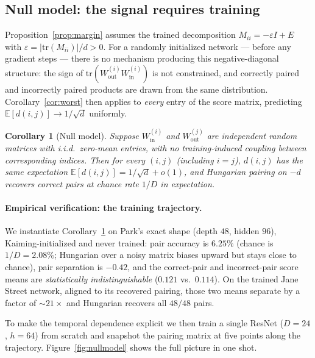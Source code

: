 \documentclass[10pt]{article}
\newtheorem{corollary}{Corollary}
\theoremstyle{remark}
\begin{document}
\subsection{Null model: the signal requires training}\label{sec:nullmodel}

Proposition~\ref{prop:margin} assumes the trained decomposition
$M_{ii} = -\varepsilon I + E$ with $\varepsilon = |\mathrm{tr}(M_{ii})|/d > 0$.
For a randomly initialized network --- before any gradient steps ---
there is no mechanism producing this negative-diagonal structure: the
sign of $\mathrm{tr}(W_{\mathrm{out}}^{(i)} W_{\mathrm{in}}^{(i)})$ is
not constrained, and correctly paired and incorrectly paired products
are drawn from the same distribution. Corollary~\ref{cor:worst} then
applies to \emph{every} entry of the score matrix, predicting
$\mathbb{E}[d(i,j)] \to 1/\sqrt{d}$ uniformly.

\begin{corollary}[Null model]\label{cor:null}
Suppose $W_{\mathrm{in}}^{(i)}$ and $W_{\mathrm{out}}^{(j)}$ are
independent random matrices with i.i.d.\ zero-mean entries, with no
training-induced coupling between corresponding indices. Then for every
$(i,j)$ (including $i=j$), $d(i,j)$ has the same expectation
$\mathbb{E}[d(i,j)] = 1/\sqrt{d} + o(1)$, and Hungarian pairing on
$-d$ recovers correct pairs at chance rate $1/D$ in expectation.
\end{corollary}

\paragraph{Empirical verification: the training trajectory.} We
instantiate Corollary~\ref{cor:null} on Park's exact shape (depth $48$,
hidden $96$), Kaiming-initialized and never trained: pair accuracy is
$6.25\%$ (chance is $1/D = 2.08\%$; Hungarian over a noisy matrix
biases upward but stays close to chance), pair separation is $-0.42$,
and the correct-pair and incorrect-pair score means are
\emph{statistically indistinguishable} ($0.121$ vs.\ $0.114$). On the
trained Jane Street network, aligned to its recovered pairing, those
two means separate by a factor of $\sim 21\times$ and Hungarian
recovers all $48/48$ pairs.

To make the temporal dependence explicit we then train a single
ResNet ($D{=}24$, $h{=}64$) from scratch and snapshot the pairing
matrix at five points along the trajectory. Figure~\ref{fig:nullmodel}
shows the full picture in one shot.
\end{document}
